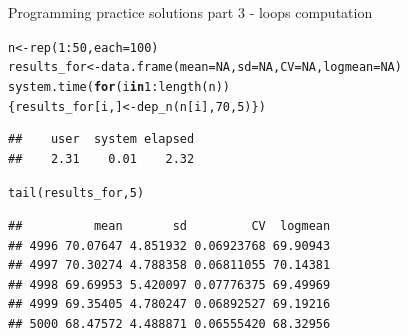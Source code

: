 \documentclass[xcolor=table,       handout,    xcolor=dvipsnames]{beamer}\usepackage[]{graphicx}\usepackage[]{color}
\makeatletter
\newcommand{\hlnum}[1]{\textcolor[rgb]{0,0,0}{#1}}
\newcommand{\hlopt}[1]{\textcolor[rgb]{0,0,0}{#1}}
\newcommand{\hlstd}[1]{\textcolor[rgb]{0,0,0}{#1}}
\newcommand{\hlkwa}[1]{\textcolor[rgb]{1,0,0}{\textbf{#1}}}
\newcommand{\hlkwb}[1]{\textcolor[rgb]{0,0,0}{#1}}
\newcommand{\hlkwc}[1]{\textcolor[rgb]{1,0,1}{#1}}
\newcommand{\hlkwd}[1]{\textcolor[rgb]{0,0,1}{#1}}
\newenvironment{kframe}{%
 \def\at@end@of@kframe{}%
 \ifinner\ifhmode%
  \def\at@end@of@kframe{\end{minipage}}%
  \begin{minipage}{\columnwidth}%
 \fi\fi%
 \def\FrameCommand##1{\hskip\@totalleftmargin \hskip-\fboxsep
 \colorbox{shadecolor}{##1}\hskip-\fboxsep
     \hskip-\linewidth \hskip-\@totalleftmargin \hskip\columnwidth}%
 \MakeFramed {\advance\hsize-\width
   \@totalleftmargin\z@ \linewidth\hsize
   \@setminipage}}%
 {\par\unskip\endMakeFramed%
 \at@end@of@kframe}
\newenvironment{knitrout}{}{} %
\makeatother
\begin{document}

\begin{frame}[fragile]{Programming practice solutions part 3 - loops computation}
\begin{knitrout}
\color{fgcolor}\begin{kframe}
\begin{alltt}
\hlstd{n} \hlkwb{<-} \hlkwd{rep}\hlstd{(}\hlnum{1}\hlopt{:}\hlnum{50}\hlstd{,} \hlkwc{each}\hlstd{=}\hlnum{100}\hlstd{)}
\hlstd{results_for} \hlkwb{<-} \hlkwd{data.frame}\hlstd{(}\hlkwc{mean}\hlstd{=}\hlnum{NA}\hlstd{,} \hlkwc{sd}\hlstd{=}\hlnum{NA}\hlstd{,} \hlkwc{CV}\hlstd{=}\hlnum{NA}\hlstd{,} \hlkwc{logmean}\hlstd{=}\hlnum{NA}\hlstd{)}
\hlkwd{system.time}\hlstd{(} \hlkwa{for}\hlstd{(i} \hlkwa{in} \hlnum{1}\hlopt{:}\hlkwd{length}\hlstd{(n))}
  \hlstd{\{results_for[i, ]} \hlkwb{<-} \hlkwd{dep_n}\hlstd{(n[i],} \hlnum{70}\hlstd{,}\hlnum{5}\hlstd{)\})}
\end{alltt}
\begin{verbatim}
##    user  system elapsed 
##    2.31    0.01    2.32
\end{verbatim}
\begin{alltt}
\hlkwd{tail}\hlstd{(results_for,} \hlnum{5}\hlstd{)}
\end{alltt}
\begin{verbatim}
##          mean       sd         CV  logmean
## 4996 70.07647 4.851932 0.06923768 69.90943
## 4997 70.30274 4.788358 0.06811055 70.14381
## 4998 69.69953 5.420097 0.07776375 69.49969
## 4999 69.35405 4.780247 0.06892527 69.19216
## 5000 68.47572 4.488871 0.06555420 68.32956
\end{verbatim}
\end{kframe}
\end{knitrout}

\end{frame}

\end{document}
